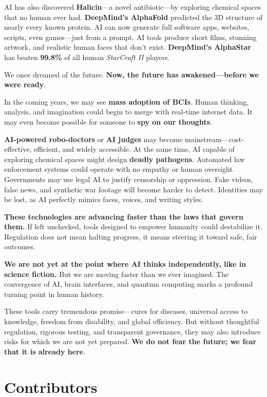 \documentclass[a4paper,10pt,twocolumn]{memoir}
\begin{document}
AI has also discovered \textbf{Halicin}—a novel antibiotic—by exploring chemical spaces that no human ever had. \textbf{DeepMind’s AlphaFold} predicted the 3D structure of nearly every known protein. AI can now generate full software apps, websites, scripts, even games—just from a prompt. AI tools produce short films, stunning artwork, and realistic human faces that don’t exist. \textbf{DeepMind’s AlphaStar} has beaten \textbf{99.8\%} of all human \textit{StarCraft II} players.

We once dreamed of the future. \textbf{Now, the future has awakened—before we were ready}.

In the coming years, we may see \textbf{mass adoption of BCIs}. Human thinking, analysis, and imagination could begin to merge with real-time internet data. It may even become possible for someone to \textbf{spy on our thoughts}.

\textbf{AI-powered robo-doctors} or \textbf{AI judges} may become mainstream—cost-effective, efficient, and widely accessible. At the same time, AI capable of exploring chemical spaces might design \textbf{deadly pathogens}. Automated law enforcement systems could operate with no empathy or human oversight. Governments may use legal AI to justify censorship or oppression. Fake videos, false news, and synthetic war footage will become harder to detect. Identities may be lost, as AI perfectly mimics faces, voices, and writing styles.

\textbf{These technologies are advancing faster than the laws that govern them.} If left unchecked, tools designed to empower humanity could destabilize it. Regulation does not mean halting progress, it means steering it toward safe, fair outcomes.

\textbf{We are not yet at the point where AI thinks independently, like in science fiction.} But we are moving faster than we ever imagined. The convergence of AI, brain interfaces, and quantum computing marks a profound turning point in human history.

These tools carry tremendous promise—cures for diseases, universal access to knowledge, freedom from disability, and global efficiency. But without thoughtful regulation, rigorous testing, and transparent governance, they may also introduce risks for which we are not yet prepared. \textbf{We do not fear the future; we fear that it is already here}.
\clearpage


\clearpage
\section*{Contributors}
\vspace*{0.2cm}  %
\end{document}

